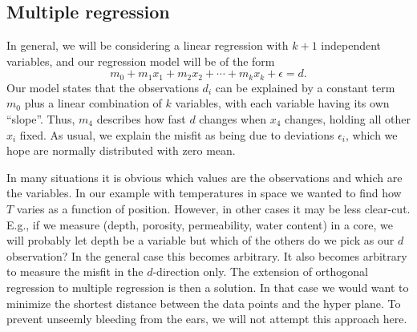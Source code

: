 \subsection{Multiple regression}
\label{sec:mregexample}
In general, we will be considering a linear regression 
with $k+1$ independent variables, and our regression model will be of the form
\begin{equation}
m_0 + m_1 x_1 +  m_2 x_2 + \cdots + m_k x_k + \epsilon = d.
 \end{equation}	 	
Our model states that the observations $d_i$ can be explained by a constant term $m_0$ plus a linear 
combination of $k$ variables, with each variable having its own ``slope''.  Thus, $m_4$ describes how 
fast $d$ changes when $x_4$ changes, holding all other $x_i$ fixed.  As usual, we explain the misfit as 
being due to deviations $\epsilon_i$, which we hope are normally distributed with zero mean.
	
In many situations it is obvious which values are the observations and which are the 
variables.  In our example with temperatures in space we wanted to  find how $T$ varies as a 
function of position.  However, in other cases it may be less clear-cut.  E.g., if we measure (depth, 
porosity, permeability, water content) in a core, we will probably let depth be a variable but which 
of the others do we pick as our $d$ observation?  In the general case this becomes arbitrary.  It also becomes 
arbitrary to measure the misfit in the $d$-direction only.  The extension of orthogonal regression to 
multiple regression is then a solution. In that case we would want to minimize the shortest distance 
between the data points and the hyper plane.  To prevent unseemly bleeding from the ears, we will not attempt this approach here.
	

